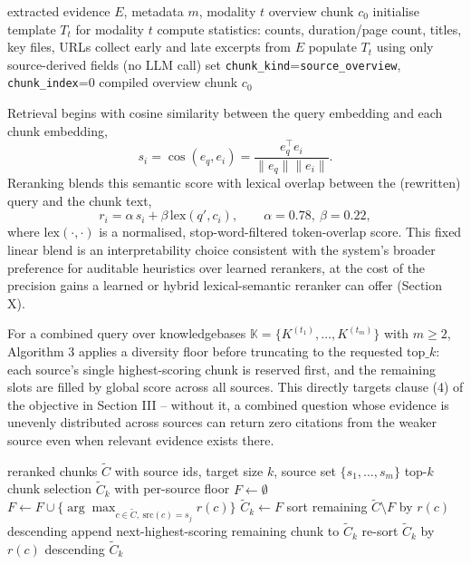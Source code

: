 \documentclass[conference]{IEEEtran}
\begin{document}
\begin{algorithm}[t]
\caption{Deterministic source-overview generation}
\begin{algorithmic}[1]
\REQUIRE extracted evidence $E$, metadata $m$, modality $t$
\ENSURE overview chunk $c_0$
\STATE initialise template $T_t$ for modality $t$
\STATE compute statistics: counts, duration/page count, titles, key files, URLs
\STATE collect early and late excerpts from $E$
\STATE populate $T_t$ using only source-derived fields (no LLM call)
\STATE set \texttt{chunk\_kind}=\texttt{source\_overview}, \texttt{chunk\_index}=0
\RETURN compiled overview chunk $c_0$
\end{algorithmic}
\end{algorithm}

Retrieval begins with cosine similarity between the query embedding and
each chunk embedding,
\begin{equation}
s_i = \cos(e_q, e_i) = \frac{e_q^{\top} e_i}{\lVert e_q\rVert \lVert e_i\rVert}.
\end{equation}
Reranking blends this semantic score with lexical overlap between the
(rewritten) query and the chunk text,
\begin{equation}
r_i = \alpha\, s_i + \beta\, \mathrm{lex}(q', c_i), \qquad \alpha = 0.78,\ \beta = 0.22,
\end{equation}
where $\mathrm{lex}(\cdot,\cdot)$ is a normalised, stop-word-filtered
token-overlap score. This fixed linear blend is an interpretability
choice consistent with the system's broader preference for auditable
heuristics over learned rerankers, at the cost of the precision gains a
learned or hybrid lexical-semantic reranker can offer (Section X).

For a combined query over knowledgebases $\mathbb{K} = \{K^{(t_1)}, \dots,
K^{(t_m)}\}$ with $m \ge 2$, Algorithm 3 applies a diversity floor before
truncating to the requested $\mathrm{top\_}k$: each source's single
highest-scoring chunk is reserved first, and the remaining slots are
filled by global score across all sources. This directly targets clause
(4) of the objective in Section III -- without it, a combined question
whose evidence is unevenly distributed across sources can return zero
citations from the weaker source even when relevant evidence exists
there.

\begin{algorithm}[t]
\caption{Diversity-floor reranking for combined queries}
\begin{algorithmic}[1]
\REQUIRE reranked chunks $\widetilde{C}$ with source ids, target size $k$, source set $\{s_1,\dots,s_m\}$
\ENSURE top-$k$ chunk selection $\widetilde{C}_k$ with per-source floor
\STATE $F \gets \emptyset$
  \STATE $F \gets F \cup \{\arg\max_{c \in \widetilde{C},\ \mathrm{src}(c)=s_j} r(c)\}$
\ENDFOR
\STATE $\widetilde{C}_k \gets F$
\STATE sort remaining $\widetilde{C} \setminus F$ by $r(c)$ descending
  \STATE append next-highest-scoring remaining chunk to $\widetilde{C}_k$
\ENDWHILE
\STATE re-sort $\widetilde{C}_k$ by $r(c)$ descending
\RETURN $\widetilde{C}_k$
\end{algorithmic}
\end{algorithm}
\end{document}
